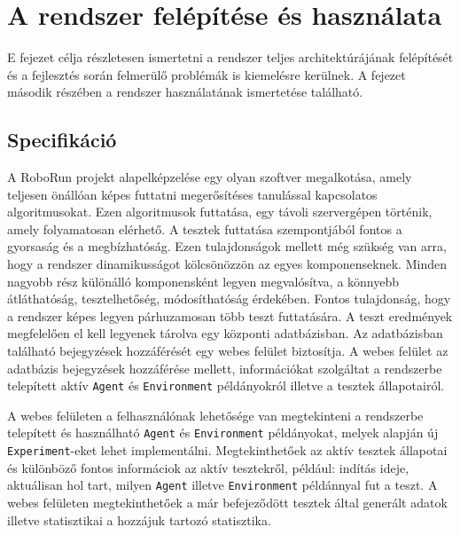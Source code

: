 \chapter{A rendszer felépítése és használata}\label{ch:Felepites}

\begin{osszefoglal}
	E fejezet célja részletesen ismertetni a rendszer teljes architektúrájának felépítését és a fejlesztés során felmerülő problémák is kiemelésre kerülnek. A fejezet második részében a rendszer használatának ismertetése található. 
\end{osszefoglal}


\section{Specifikáció}\label{sec:Specifikacio}

A RoboRun projekt alapelképzelése egy olyan szoftver megalkotása, amely teljesen önállóan képes futtatni megerősítéses tanulással kapcsolatos algoritmusokat. Ezen algoritmusok futtatása, egy távoli szervergépen történik, amely folyamatosan elérhető. A tesztek futtatása szempontjából fontos a gyorsaság és a megbízhatóság. Ezen tulajdonságok mellett még szükség van arra, hogy a rendszer dinamikusságot kölcsönözzön az egyes komponenseknek. Minden nagyobb rész különálló komponensként legyen megvalósítva, a könnyebb átláthatóság, tesztelhetőség, módosíthatóság érdekében. Fontos tulajdonság, hogy a rendszer képes legyen párhuzamosan több teszt futtatására. A teszt eredmények megfelelően el kell legyenek tárolva egy központi adatbázisban. Az adatbázisban található bejegyzések hozzáférését egy webes felület biztosítja. A webes felület az adatbázis bejegyzések hozzáférése mellett, információkat szolgáltat a rendszerbe telepített aktív \texttt{Agent} és \texttt{Environment} példányokról illetve a tesztek állapotairól.

A webes felületen a felhasználónak lehetősége van megtekinteni a rendszerbe telepített és használható \texttt{Agent} és \texttt{Environment} példányokat, melyek alapján új \texttt{Experiment}-eket lehet implementálni. Megtekinthetőek az aktív tesztek állapotai és különböző fontos informáciok az aktív tesztekről, például: indítás ideje, aktuálisan hol tart, milyen \texttt{Agent} illetve \texttt{Environment} példánnyal fut a teszt. A webes felületen megtekinthetőek a már befejeződött tesztek által generált adatok illetve statisztikai a hozzájuk tartozó statisztika. 


